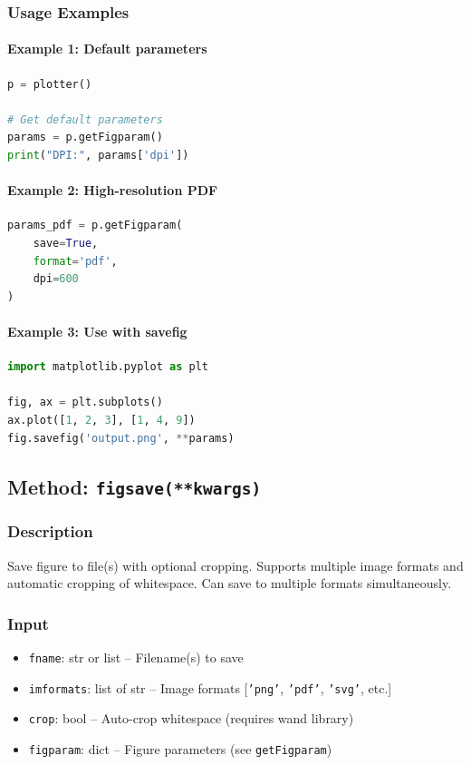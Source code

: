 \documentclass[11pt,a4paper]{article}
\begin{document}
\subsubsection{Usage Examples}

\paragraph{Example 1: Default parameters}
\begin{lstlisting}[language=Python, caption=Get default figure parameters]
p = plotter()

# Get default parameters
params = p.getFigparam()
print("DPI:", params['dpi'])
\end{lstlisting}

\paragraph{Example 2: High-resolution PDF}
\begin{lstlisting}[language=Python, caption=High-resolution PDF parameters]
params_pdf = p.getFigparam(
    save=True,
    format='pdf',
    dpi=600
)
\end{lstlisting}

\paragraph{Example 3: Use with savefig}
\begin{lstlisting}[language=Python, caption=Using parameters with matplotlib]
import matplotlib.pyplot as plt

fig, ax = plt.subplots()
ax.plot([1, 2, 3], [1, 4, 9])
fig.savefig('output.png', **params)
\end{lstlisting}

\subsection{Method: \texttt{figsave(**kwargs)}}

\subsubsection{Description}
Save figure to file(s) with optional cropping. Supports multiple image formats and automatic cropping of whitespace. Can save to multiple formats simultaneously.

\subsubsection{Input}
\begin{itemize}[leftmargin=*]
    \item \texttt{fname}: str or list -- Filename(s) to save
    \item \texttt{imformats}: list of str -- Image formats [\texttt{'png'}, \texttt{'pdf'}, \texttt{'svg'}, etc.]
    \item \texttt{crop}: bool -- Auto-crop whitespace (requires wand library)
    \item \texttt{figparam}: dict -- Figure parameters (see \texttt{getFigparam})
\end{itemize}
\end{document}
